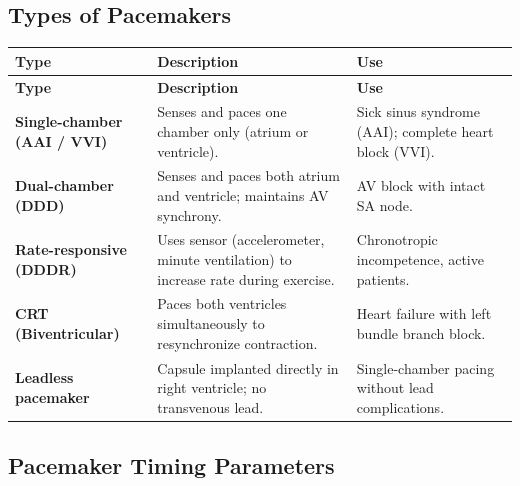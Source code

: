 \documentclass[12pt,a4paper]{article}
\begin{document}
\subsection{Types of Pacemakers}

\par\noindent
\begingroup
\setlength{\LTleft}{0pt}
\setlength{\LTright}{0pt}
\begin{longtable}{|B{2.8cm}|>{\small\raggedright\arraybackslash}m{\dimexpr(\linewidth-2.8cm-6\arrayrulewidth)/2\relax}|>{\small\raggedright\arraybackslash}m{\dimexpr(\linewidth-2.8cm-6\arrayrulewidth)/2\relax}|}
\hline
\textbf{Type} & \textbf{\color{myteal}Description} & \textbf{\color{mygreen}Use} \\
\hline
\endfirsthead
\hline
\textbf{Type} & \textbf{\color{myteal}Description} & \textbf{\color{mygreen}Use} \\
\hline
\endhead
\textbf{Single-chamber (AAI / VVI)} & Senses and paces one chamber only (atrium or ventricle). & Sick sinus syndrome (AAI); complete heart block (VVI). \\
\hline
\textbf{Dual-chamber (DDD)} & Senses and paces both atrium and ventricle; maintains AV synchrony. & AV block with intact SA node. \\
\hline
\textbf{Rate-responsive (DDDR)} & Uses sensor (accelerometer, minute ventilation) to increase rate during exercise. & Chronotropic incompetence, active patients. \\
\hline
\textbf{CRT (Biventricular)} & Paces both ventricles simultaneously to resynchronize contraction. & Heart failure with left bundle branch block. \\
\hline
\textbf{Leadless pacemaker} & Capsule implanted directly in right ventricle; no transvenous lead. & Single-chamber pacing without lead complications. \\
\hline
\end{longtable}
\endgroup

\subsection{Pacemaker Timing Parameters}
\end{document}
